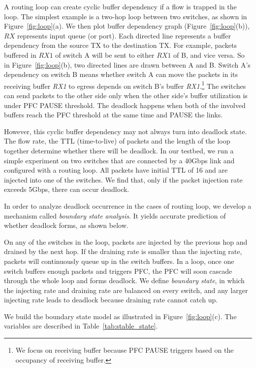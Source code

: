 A routing loop can create cyclic buffer dependency if a flow is trapped in the loop.
The simplest example is a two-hop loop between two switches, as shown in Figure~\ref{fig:loop}(a).
We then plot buffer dependency graph (Figure~\ref{fig:loop}(b)), $RX$ represents input 
queue (or port). Each directed line represents a buffer dependency from the source TX to the 
destination TX. For example, packets buffered in $RX1$ of switch A will be sent to either $RX1$ 
of B, and vice versa. So in Figure~\ref{fig:loop}(b), two directed lines are drawn between A and B.
Switch A's dependency on switch B means whether switch A can move
the packets in its receiving buffer {\em RX1} to egress depends on switch B's buffer {\em RX1}.\footnote{We 
focus on receiving buffer because PFC PAUSE triggers based on the occupancy of receiving buffer.}
The switches can send packets to the other side only 
when the other side's buffer utilization is under PFC PAUSE threshold. The deadlock happens when
both of the involved buffers reach the PFC threshold at the same time and PAUSE the links.  


However, this cyclic buffer dependency may not always turn into deadlock state. The flow
 rate, the TTL (time-to-live) of packets and the length of the loop together 
determine whether there will be deadlock. In our testbed, we run a simple experiment on 
two switches that are connected by a 40Gbps link and configured with a routing loop. 
All packets have initial TTL of 16 and are injected into one of the switches. We find that, 
only if the packet injection rate exceeds 5Gbps, there can occur deadlock. 

In order to analyze deadlock occurrence in the cases of routing loop, we develop a mechanism called 
{\em boundary state analysis}. It yields accurate prediction of whether deadlock forms,
as shown below.

On any of the switches in the loop, packets are injected by the previous hop and drained by the next hop. 
If the draining rate is smaller than the injecting rate, packets will continuously queue up in the
switch buffers. In a loop, once one switch buffers enough packets and triggers PFC, the PFC will soon
cascade through the whole loop and forms deadlock. 
We define {\em boundary state}, in which the injecting rate and draining rate are balanced on every
switch, and any larger injecting rate leads to deadlock because draining rate cannot catch up.

We build the boundary state model as illustrated in 
Figure~\ref{fig:loop}(c). The variables are described in Table~\ref{tab:stable_state}.


